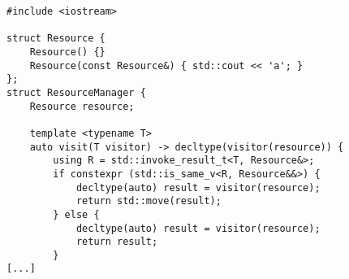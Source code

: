 \begin{lstlisting}[title=\href{https://godbolt.org/z/8heP76}{\texttt{godbolt.org/z/8heP76}}]
#include <iostream>

struct Resource {
    Resource() {}
    Resource(const Resource&) { std::cout << 'a'; }
};
struct ResourceManager {
    Resource resource;

    template <typename T>
    auto visit(T visitor) -> decltype(visitor(resource)) {
        using R = std::invoke_result_t<T, Resource&>;
        if constexpr (std::is_same_v<R, Resource&&>) {
            decltype(auto) result = visitor(resource);
            return std::move(result);
        } else {
            decltype(auto) result = visitor(resource);
            return result;
        }
[...]
\end{lstlisting}
